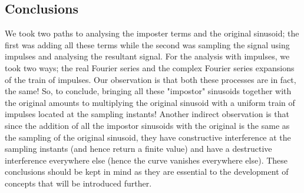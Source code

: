 \subsection{Conclusions}
We took two paths to analysing the imposter terms and the original sinusoid; the first was adding all these terms while the second was sampling the signal using impulses and analysing the resultant signal. For the analysis with impulses, we took two ways; the real Fourier series and the complex Fourier series expansions of the train of impulses.
\newline
Our observation is that both these processes are in fact, the same!
\newline
So, to conclude, bringing all these "impostor" sinusoids together with the original amounts to multiplying the original sinusoid with a uniform train of impulses located at the sampling instants!
\newline
Another indirect observation is that since the addition of all the impostor sinusoids with the original is the same as the sampling of the original sinusoid, they have constructive interference at the sampling instants (and hence return a finite value) and have a destructive interference everywhere else (hence the curve vanishes everywhere else).
\newline
These conclusions should be kept in mind as they are essential to the development of concepts that will be introduced further.

